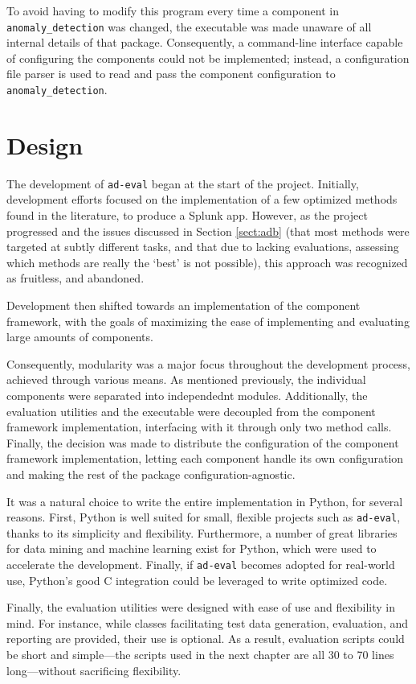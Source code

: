 To avoid having to modify this program every time a component in \texttt{anomaly\_detection} was changed, the executable was made unaware of all internal details of that package. Consequently, a command-line interface capable of configuring the components could not be implemented; instead, a configuration file parser is used to read and pass the component configuration to \texttt{anomaly\_detection}.

\section{Design}
\label{sect:design}

The development of \texttt{ad-eval} began at the start of the project. Initially, development efforts focused on the implementation of a few optimized methods found in the literature, to produce a Splunk app. However, as the project progressed and the issues discussed in Section \ref{sect:adb} (that most methods were targeted at subtly different tasks, and that due to lacking evaluations, assessing which methods are really the `best' is not possible), this approach was recognized as fruitless, and abandoned.

Development then shifted towards an implementation of the component framework, with the goals of maximizing the ease of implementing and evaluating large amounts of components.

Consequently, modularity was a major focus throughout the development process, achieved through various means. As mentioned previously, the individual components were separated into independednt modules. Additionally, the evaluation utilities and the executable were decoupled from the component framework implementation, interfacing with it through only two method calls. Finally, the decision was made to distribute the configuration of the component framework implementation, letting each component handle its own configuration and making the rest of the package configuration-agnostic.

It was a natural choice to write the entire implementation in Python, for several reasons. First, Python is well suited for small, flexible projects such as \texttt{ad-eval}, thanks to its simplicity and flexibility. Furthermore, a number of great libraries for data mining and machine learning exist for Python, which were used to accelerate the development. Finally, if \texttt{ad-eval} becomes adopted for real-world use, Python's good C integration could be leveraged to write optimized code. 

Finally, the evaluation utilities were designed with ease of use and flexibility in mind. For instance, while classes facilitating test data generation, evaluation, and reporting are provided, their use is optional. As a result, evaluation scripts could be short and simple---the scripts used in the next chapter are all 30 to 70 lines long---without sacrificing flexibility.
